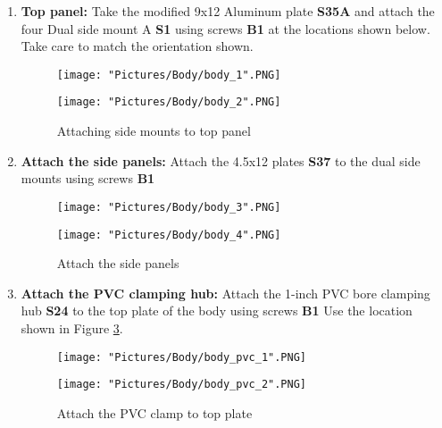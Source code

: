 \documentclass[12pt]{article}
\begin{document}
\begin{enumerate}
\item \textbf{Top panel: } Take the modified 9x12 Aluminum plate \textbf{S35A} and attach the four Dual side mount A \textbf{S1} using screws \textbf{B1} at the locations shown below. Take care to match the orientation shown. 

\begin{figure}[H]
  	\centering
  	\begin{minipage}[b]{0.45\textwidth}
    		\texttt{[image: "Pictures/Body/body\_1".PNG]}
  	\end{minipage}
  	\hfill
  	\begin{minipage}[b]{0.45\textwidth}
    		\texttt{[image: "Pictures/Body/body\_2".PNG]}
  	\end{minipage}
  	\caption{Attaching side mounts to top panel}
	\label{top_plate}
\end{figure}

\item \textbf{Attach the side panels: } Attach the 4.5x12 plates \textbf{S37} to the dual side mounts using screws \textbf{B1} 

\begin{figure}[H]
 	\centering
 	\begin{minipage}[b]{0.45\textwidth}
    		\texttt{[image: "Pictures/Body/body\_3".PNG]}
  	\end{minipage}
  	\hfill
  	\begin{minipage}[b]{0.45\textwidth}
    		\texttt{[image: "Pictures/Body/body\_4".PNG]}
  	\end{minipage}
  	\caption{Attach the side panels}
	\label{Body side panels}
\end{figure}

\item \textbf{Attach the PVC clamping hub:} Attach the 1-inch PVC bore clamping hub \textbf{S24} to the top plate of the body using screws \textbf{B1} Use the location shown in Figure \ref{pvc to top plate}.

\begin{figure}[H]
  \centering
  \begin{minipage}[b]{0.40\textwidth}
    \texttt{[image: "Pictures/Body/body\_pvc\_1".PNG]}
  \end{minipage}
  \hfill
  \begin{minipage}[b]{0.50\textwidth}
    \texttt{[image: "Pictures/Body/body\_pvc\_2".PNG]}
  \end{minipage}
  \caption{Attach the PVC clamp to top plate}
	\label{pvc to top plate}
\end{figure}

\end{enumerate}
\end{document}
